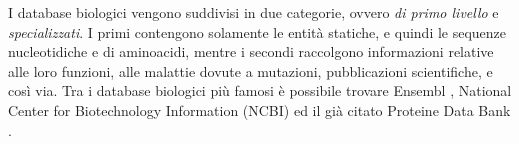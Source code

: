 I database biologici vengono suddivisi in due categorie, ovvero \textit{di primo livello} e \textit{specializzati}. I primi contengono solamente le entità statiche, e quindi le sequenze nucleotidiche e di aminoacidi, mentre i secondi raccolgono informazioni relative alle loro funzioni, alle malattie dovute a mutazioni, pubblicazioni scientifiche, e così via.
\newline
Tra i database biologici più famosi è possibile trovare Ensembl \cite{ensembl}, National Center for Biotechnology Information (NCBI) \cite{NCBI} ed il già citato Proteine Data Bank \cite{proteineDataBank}.
